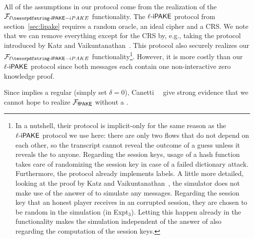 All of the assumptions in our protocol come from the realization of the $\Flipake$ functionality. 
The $\ell\textsf{-iPAKE}$ protocol from section~\ref{sec:lipake} requires a random oracle, an ideal cipher and a CRS. We note that we can remove everything except for the CRS by, e.g., taking the \PAKE protocol introduced by Katz and Vaikuntanathan~\cite{TCC:KatVai11}. This protocol also securely realizes our $\Flipake$ functionality\footnote{In a nutshell, their protocol is implicit-only for the same reason as the $\ell\textsf{-iPAKE}$ protocol we use here: there are only two flows that do not depend on each other, so the transcript cannot reveal the outcome of a guess unless it reveals the \password to anyone. Regarding the session keys, usage of a hash function takes care of randomizing the session key in case of a failed dictionary attack. Furthermore, the protocol already implements labels. A little more detailed, looking at the proof by Katz and Vaikuntanathan~\cite{TCC:KatVai11}, the simulator does not make use of the answer of \TestPwd to simulate any messages. Regarding the session key that an honest player receives in an corrupted session, they are chosen to be random in the simulation (in Expt$_3$). Letting this happen already in the functionality makes the simulation independent of the answer of \TestPwd also regarding the computation of the session keys.}.
However, it is more costly than our $\ell\textsf{-iPAKE}$ protocol since both messages each contain one non-interactive zero knowledge proof. 

Since \fPAKE implies a regular \PAKE (simply set $\delta = 0$), Canetti~\etal~\cite{EC:CHKLM05} give strong evidence that we cannot hope to realize $\mathcal{F}_\textsf{fPAKE}$ without a \CRS.

